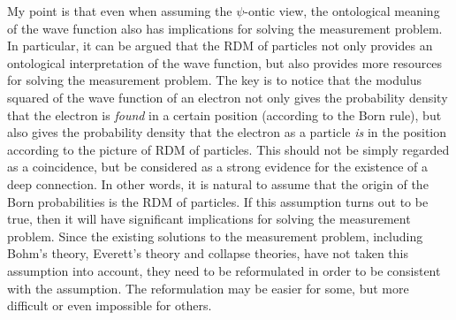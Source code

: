 My point is that even when assuming the $\psi$-ontic view, the ontological meaning of the wave function also has implications for solving the measurement problem. 
In particular, it can be argued that the RDM of particles not only provides an ontological interpretation of the wave function, but also provides more resources for solving the measurement problem.
The key is to notice that the modulus squared of the wave function of an electron not only gives the probability density that the electron is  \emph{found} in a certain position (according to the Born rule), but also gives the probability density that the electron as a particle \emph{is} in the position according to the picture of RDM of particles. 
This should not be simply regarded as a coincidence, but be considered as a strong evidence for the existence of a deep connection.
In other words, it is natural to assume that the origin of the Born probabilities is the RDM of particles. 
If this assumption turns out to be true, then it will have significant implications for solving the measurement problem.
Since the existing solutions to the measurement problem, including Bohm's theory, Everett's theory and collapse theories, have not taken this assumption into account, they need to be reformulated in order to be consistent with the assumption.
The reformulation may be easier for some, but more difficult or even impossible for others.

